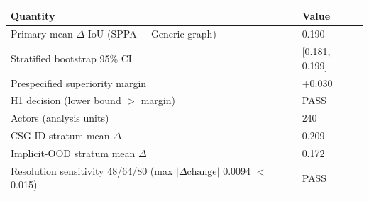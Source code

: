 \begin{tabular}{@{}ll@{}}
\toprule
Quantity & Value \\
\midrule
Primary mean $\Delta$ IoU (SPPA $-$ Generic graph) & 0.190 \\
Stratified bootstrap 95\% CI & [0.181, 0.199] \\
Prespecified superiority margin & +0.030 \\
H1 decision (lower bound $>$ margin) & PASS \\
Actors (analysis units) & 240 \\
CSG-ID stratum mean $\Delta$ & 0.209 \\
Implicit-OOD stratum mean $\Delta$ & 0.172 \\
Resolution sensitivity 48/64/80 (max $|\Delta\mathrm{change}|$ 0.0094 $<$ 0.015) & PASS \\
\bottomrule
\end{tabular}

